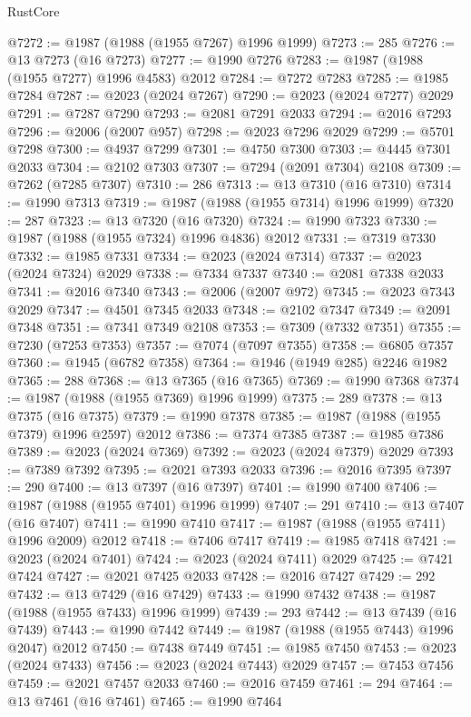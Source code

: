 \begin{lexlean}{RustCore}
\begin{coremodule}
@7272 := @1987 (@1988 (@1955 @7267) @1996 @1999)
@7273 := 285
@7276 := @13 @7273 (@16 @7273)
@7277 := @1990 @7276
@7283 := @1987 (@1988 (@1955 @7277) @1996 @4583) @2012
@7284 := @7272 @7283
@7285 := @1985 @7284
@7287 := @2023 (@2024 @7267)
@7290 := @2023 (@2024 @7277) @2029
@7291 := @7287 @7290
@7293 := @2081 @7291 @2033
@7294 := @2016 @7293
@7296 := @2006 (@2007 @957)
@7298 := @2023 @7296 @2029
@7299 := @5701 @7298
@7300 := @4937 @7299
@7301 := @4750 @7300
@7303 := @4445 @7301 @2033
@7304 := @2102 @7303
@7307 := @7294 (@2091 @7304) @2108
@7309 := @7262 (@7285 @7307)
@7310 := 286
@7313 := @13 @7310 (@16 @7310)
@7314 := @1990 @7313
@7319 := @1987 (@1988 (@1955 @7314) @1996 @1999)
@7320 := 287
@7323 := @13 @7320 (@16 @7320)
@7324 := @1990 @7323
@7330 := @1987 (@1988 (@1955 @7324) @1996 @4836) @2012
@7331 := @7319 @7330
@7332 := @1985 @7331
@7334 := @2023 (@2024 @7314)
@7337 := @2023 (@2024 @7324) @2029
@7338 := @7334 @7337
@7340 := @2081 @7338 @2033
@7341 := @2016 @7340
@7343 := @2006 (@2007 @972)
@7345 := @2023 @7343 @2029
@7347 := @4501 @7345 @2033
@7348 := @2102 @7347
@7349 := @2091 @7348
@7351 := @7341 @7349 @2108
@7353 := @7309 (@7332 @7351)
@7355 := @7230 (@7253 @7353)
@7357 := @7074 (@7097 @7355)
@7358 := @6805 @7357
@7360 := @1945 (@6782 @7358)
@7364 := @1946 (@1949 @285) @2246 @1982
@7365 := 288
@7368 := @13 @7365 (@16 @7365)
@7369 := @1990 @7368
@7374 := @1987 (@1988 (@1955 @7369) @1996 @1999)
@7375 := 289
@7378 := @13 @7375 (@16 @7375)
@7379 := @1990 @7378
@7385 := @1987 (@1988 (@1955 @7379) @1996 @2597) @2012
@7386 := @7374 @7385
@7387 := @1985 @7386
@7389 := @2023 (@2024 @7369)
@7392 := @2023 (@2024 @7379) @2029
@7393 := @7389 @7392
@7395 := @2021 @7393 @2033
@7396 := @2016 @7395
@7397 := 290
@7400 := @13 @7397 (@16 @7397)
@7401 := @1990 @7400
@7406 := @1987 (@1988 (@1955 @7401) @1996 @1999)
@7407 := 291
@7410 := @13 @7407 (@16 @7407)
@7411 := @1990 @7410
@7417 := @1987 (@1988 (@1955 @7411) @1996 @2009) @2012
@7418 := @7406 @7417
@7419 := @1985 @7418
@7421 := @2023 (@2024 @7401)
@7424 := @2023 (@2024 @7411) @2029
@7425 := @7421 @7424
@7427 := @2021 @7425 @2033
@7428 := @2016 @7427
@7429 := 292
@7432 := @13 @7429 (@16 @7429)
@7433 := @1990 @7432
@7438 := @1987 (@1988 (@1955 @7433) @1996 @1999)
@7439 := 293
@7442 := @13 @7439 (@16 @7439)
@7443 := @1990 @7442
@7449 := @1987 (@1988 (@1955 @7443) @1996 @2047) @2012
@7450 := @7438 @7449
@7451 := @1985 @7450
@7453 := @2023 (@2024 @7433)
@7456 := @2023 (@2024 @7443) @2029
@7457 := @7453 @7456
@7459 := @2021 @7457 @2033
@7460 := @2016 @7459
@7461 := 294
@7464 := @13 @7461 (@16 @7461)
@7465 := @1990 @7464

\end{coremodule}
\end{lexlean}
